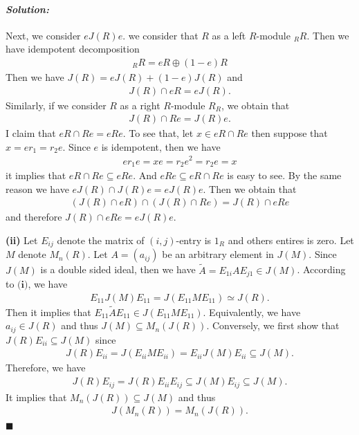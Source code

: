 \documentclass[12pt, a4paper]{article}
\theoremstyle{remark}
\newenvironment{solution}
  {\paragraph{\textit{Solution:}}\par\medskip}
  {\hfill$\blacksquare$\vspace{0.1cm}}
\begin{document}
\begin{solution}
    Next, we consider $eJ(R)e$. we consider that $R$ as a left $R$-module $_R R$. Then we have idempotent decomposition 
    \begin{align*}
        _R R = eR\oplus (1-e)R 
    \end{align*}
    Then we have $J(R) = eJ(R)+(1-e)J(R)$ and 
    \begin{align*}
        J(R)\cap eR = eJ(R). \tag{$\star$}
    \end{align*}
    Similarly, if we consider $R$ as a right $R$-module $R_R$, we obtain that 
    \begin{align*}
        J(R)\cap Re = J(R)e. \tag{$\Delta$}
    \end{align*}
    I claim that $eR\cap Re = eRe$. To see that, let $x\in eR\cap Re $ then suppose that $x= er_1=r_2e$. Since $e$ is idempotent, then we have 
    \begin{align*}
        er_1e =xe = r_2e^2=r_2e = x 
    \end{align*}
    it implies that $eR\cap Re\subseteq eRe$. And $eRe \subseteq eR\cap Re$ is easy to see. 
    By the same reason we have $eJ(R)\cap J(R)e = eJ(R)e$. Then we obtain that 
    \begin{align*}
        (J(R)\cap eR)\cap (J(R)\cap Re) = J(R)\cap eRe
    \end{align*}
    and therefore $J(R)\cap eRe = eJ(R)e$.

    \textbf{(ii)} 
    Let $E_{ij}$ denote the matrix of $(i,j)$-entry is $1_R$ and others entires is zero. 
    Let $M$ denote $M_n(R)$.
    Let $A=(a_{ij})$ be an arbitrary element in $J(M)$. Since $J(M)$ is a double sided ideal, then we have $\tilde{A}=E_{1i}AE_{j1}\in J(M)$.
    According to $\textbf{(i)}$, we have 
    \begin{align*}
        E_{11}J(M)E_{11} = J(E_{11}M E_{11}) \simeq J(R).
    \end{align*}
    Then it implies that $E_{11}\tilde{A}E_{11}\in J(E_{11}M E_{11})$. Equivalently, we have $a_{ij}\in J(R)$ and thus $J(M)\subseteq M_{n}(J(R))$.
    Conversely, we first show that $J(R)E_{ii}\subseteq J(M)$ since 
    \begin{align*}
        J(R)E_{ii}= J(E_{ii} M E_{ii})=E_{ii}J(M)E_{ii} \subseteq J(M).
    \end{align*}
    Therefore, we have 
    \begin{align*}
        J(R)E_{ij} = J(R)E_{ii}E_{ij} \subseteq J(M)E_{ij}\subseteq J(M).
    \end{align*}
    It implies that $M_n(J(R))\subseteq J(M)$ and thus 
    \begin{align*}
        J(M_n(R)) = M_n(J(R)).
    \end{align*}
\end{solution}
\end{document}
